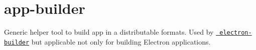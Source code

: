 \chapter{app-\/builder}
\hypertarget{md__2_users_2hello_2_documents_2_git_hub_2finalproject-engine-drop-table-engines_2_engine_2src_2e95dea25a1c942608989c084a88d7eba}{}\label{md__2_users_2hello_2_documents_2_git_hub_2finalproject-engine-drop-table-engines_2_engine_2src_2e95dea25a1c942608989c084a88d7eba}
\label{md__2_users_2hello_2_documents_2_git_hub_2finalproject-engine-drop-table-engines_2_engine_2src_2e95dea25a1c942608989c084a88d7eba_autotoc_md2215}%
%


Generic helper tool to build app in a distributable formats. Used by \href{http://github.com/electron-userland/electron-builder}{\texttt{ electron-\/builder}} but applicable not only for building Electron applications.


